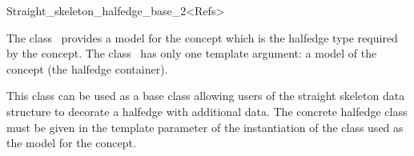 

\begin{ccRefClass}{Straight_skeleton_halfedge_base_2<Refs>}


\ccDefinition

The class \ccRefName\ provides a model for the
 concept which is the halfedge
type required by the 
concept. The class \ccRefName\ has only one template argument: a model of the  concept (the halfedge container).

This class can be used as a base class allowing users of the straight skeleton data structure to decorate a halfedge with additional data. The concrete halfedge class must be given in the  template parameter of the instantiation of the  class used as the model for the  concept.


\ccIsModel
{}\\
\\
\\
\\

\ccSeeAlso
{}\\
\\
\\
\\
\end{ccRefClass}

